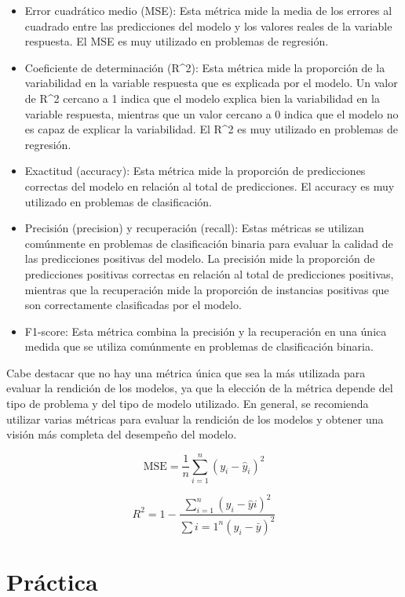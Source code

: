 \documentclass[
  letterpaper,
  DIV=11,
  numbers=noendperiod]{scrartcl}
\begin{document}
\begin{itemize}
\item
  Error cuadrático medio (MSE): Esta métrica mide la media de los
  errores al cuadrado entre las predicciones del modelo y los valores
  reales de la variable respuesta. El MSE es muy utilizado en problemas
  de regresión.
\item
  Coeficiente de determinación (R\^{}2): Esta métrica mide la proporción
  de la variabilidad en la variable respuesta que es explicada por el
  modelo. Un valor de R\^{}2 cercano a 1 indica que el modelo explica
  bien la variabilidad en la variable respuesta, mientras que un valor
  cercano a 0 indica que el modelo no es capaz de explicar la
  variabilidad. El R\^{}2 es muy utilizado en problemas de regresión.
\item
  Exactitud (accuracy): Esta métrica mide la proporción de predicciones
  correctas del modelo en relación al total de predicciones. El accuracy
  es muy utilizado en problemas de clasificación.
\item
  Precisión (precision) y recuperación (recall): Estas métricas se
  utilizan comúnmente en problemas de clasificación binaria para evaluar
  la calidad de las predicciones positivas del modelo. La precisión mide
  la proporción de predicciones positivas correctas en relación al total
  de predicciones positivas, mientras que la recuperación mide la
  proporción de instancias positivas que son correctamente clasificadas
  por el modelo.
\item
  F1-score: Esta métrica combina la precisión y la recuperación en una
  única medida que se utiliza comúnmente en problemas de clasificación
  binaria.
\end{itemize}

Cabe destacar que no hay una métrica única que sea la más utilizada para
evaluar la rendición de los modelos, ya que la elección de la métrica
depende del tipo de problema y del tipo de modelo utilizado. En general,
se recomienda utilizar varias métricas para evaluar la rendición de los
modelos y obtener una visión más completa del desempeño del modelo.

\[
\text{MSE} = \frac{1}{n} \sum_{i=1}^{n} (y_i - \hat{y}_i)^2
\]

\[
R^2 = 1 - \frac{\sum_{i=1}^{n} (y_i - \hat{y}i)^2}{\sum{i=1}^{n} (y_i - \bar{y})^2}
\]

\hypertarget{pruxe1ctica}{%
\section{Práctica}\label{pruxe1ctica}}
\end{document}
